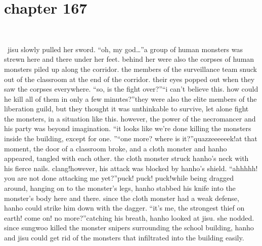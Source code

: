 \section{chapter 167}

                             




 jisu slowly pulled her sword.
“oh, my god…”a group of human monsters was strewn here and there under her feet.
 behind her were also the corpses of human monsters piled up along the corridor.
the members of the surveillance team snuck out of the classroom at the end of the corridor.
their eyes popped out when they saw the corpses everywhere.
“so, is the fight over?”“i can’t believe this.
 how could he kill all of them in only a few minutes?”they were also the elite members of the liberation guild, but they thought it was unthinkable to survive, let alone fight the monsters, in a situation like this.
however, the power of the necromancer and his party was beyond imagination.
“it looks like we’re done killing the monsters inside the building, except for one.
”“one more? where is it?”quazzeeeeeek!at that moment, the door of a classroom broke, and a cloth monster and hanho appeared, tangled with each other.
 the cloth monster struck hanho’s neck with his fierce nails.
clang!however, his attack was blocked by hanho’s shield.
“ahhhhh! you are not done attacking me yet?”puck! puck! puck!while being dragged around, hanging on to the monster’s legs, hanho stabbed his knife into the monster’s body here and there.
since the cloth monster had a weak defense, hanho could strike him down with the dagger.
“it’s me, the strongest thief on earth! come on! no more?”catching his breath, hanho looked at jisu.
 she nodded.
since sungwoo killed the monster snipers surrounding the school building, hanho and jisu could get rid of the monsters that infiltrated into the building easily.

